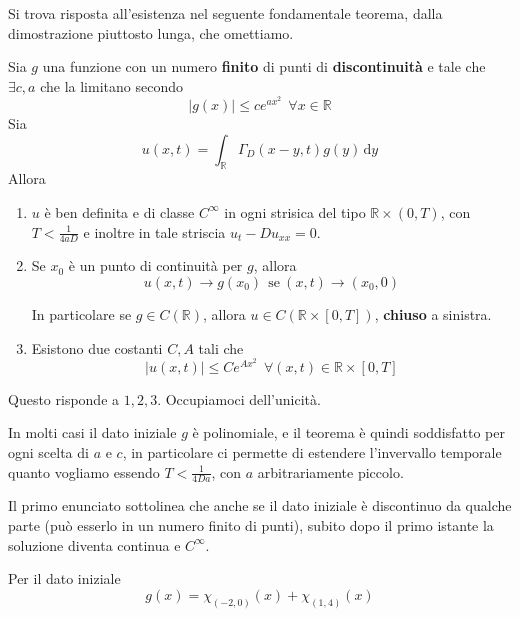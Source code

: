 \documentclass[10pt,a4paper,twoside,openright]{book}
\newcommand{\de}{\,\mathrm d}
\newcommand{\dy}{\de y}
\begin{document}
Si trova risposta all'esistenza nel seguente fondamentale teorema, dalla dimostrazione piuttosto lunga, che omettiamo.
\begin{theorem}
    [di Esistenza] Sia $g$ una funzione con un numero \textbf{finito} di punti di \textbf{discontinuità} e tale che $\exists c,a$ che la limitano secondo
    \begin{equation}
        \tag{G}
        | g(x)| \leqslant ce^{ax^{2}} \ \ \forall x\in \mathbb{R}
        \label{eq:pcg-diffusione-condizione-g}
    \end{equation}
    Sia
    \begin{equation*}
        u(x,t) =\int _{\mathbb{R}} \Gamma _{D}(x-y,t) g(y) \dy
    \end{equation*}
    Allora
    \begin{enumerate}
        \item $u$ è ben definita e di classe $C^{\infty }$ in ogni strisica del tipo $\mathbb{R} \times (0,T)$, con $T< \frac{1}{4aD}$ e inoltre in tale striscia $u_{t} -Du_{xx} =0$.
        \item Se $x_{0}$ è un punto di continuità per $g$, allora
              \begin{equation*}
                  u(x,t)\rightarrow g(x_{0}) \ \ \text{se} \ (x,t)\rightarrow (x_{0},0)
              \end{equation*}

              In particolare se $g\in C(\mathbb{R})$, allora $u\in C(\mathbb{R} \times [ 0,T])$, \textbf{chiuso} a sinistra.
        \item Esistono due costanti $C,A$ tali che
              \begin{equation*}
                  | u(x,t)| \leqslant Ce^{Ax^{2}} \ \ \forall (x,t) \in \mathbb{R} \times [ 0,T]
              \end{equation*}
    \end{enumerate}
\end{theorem}

Questo risponde a $1,2,3$. Occupiamoci dell'unicità.
\begin{oss}
    In molti casi il dato iniziale $g$ è polinomiale, e il teorema è quindi soddisfatto per ogni scelta di $a$ e $c$, in particolare ci permette di estendere l'invervallo temporale quanto vogliamo essendo $T< \frac{1}{4Da}$, con $a$ arbitrariamente piccolo.
\end{oss}
\begin{oss}
     Il primo enunciato sottolinea che anche se il dato iniziale è discontinuo da qualche parte (può esserlo in un numero finito di punti), subito dopo il primo istante la soluzione diventa continua e $C^{\infty }$.
\end{oss}
Per il dato iniziale
\begin{equation*}
    g(x) =\chi _{(-2,0)}(x) +\chi _{(1,4)}(x)
\end{equation*}
\end{document}
